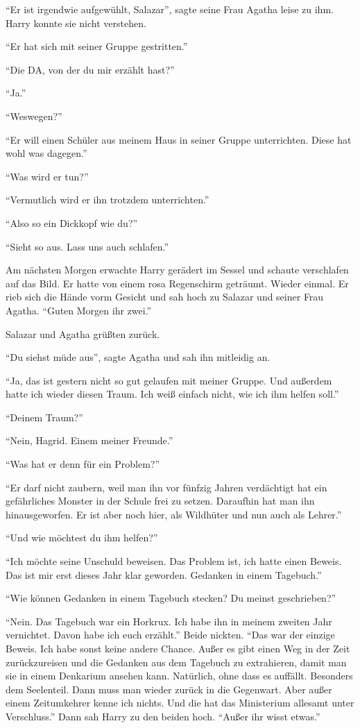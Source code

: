 \enquote{Er ist irgendwie aufgewühlt, Salazar}, sagte seine Frau Agatha leise zu ihm. Harry konnte sie nicht verstehen.

\enquote{Er hat sich mit seiner Gruppe gestritten.}

\enquote{Die DA, von der du mir erzählt hast?}

\enquote{Ja.}

\enquote{Weswegen?}

\enquote{Er will einen Schüler aus meinem Haus in seiner Gruppe unterrichten. Diese hat wohl was dagegen.}

\enquote{Was wird er tun?}

\enquote{Vermutlich wird er ihn trotzdem unterrichten.}

\enquote{Also so ein Dickkopf wie du?}

\enquote{Sieht so aus. Lass uns auch schlafen.}

Am nächsten Morgen erwachte Harry gerädert im Sessel und schaute verschlafen auf das Bild. Er hatte von einem rosa Regenschirm geträumt. Wieder einmal. Er rieb sich die Hände vorm Gesicht und sah hoch zu Salazar und seiner Frau Agatha. \enquote{Guten Morgen ihr zwei.}

Salazar und Agatha grüßten zurück.

\enquote{Du siehst müde aus}, sagte Agatha und sah ihn mitleidig an.

\enquote{Ja, das ist gestern nicht so gut gelaufen mit meiner Gruppe. Und außerdem hatte ich wieder diesen Traum. Ich weiß einfach nicht, wie ich ihm helfen soll.}

\enquote{Deinem Traum?}

\enquote{Nein, Hagrid. Einem meiner Freunde.}

\enquote{Was hat er denn für ein Problem?}

\enquote{Er darf nicht zaubern, weil man ihn vor fünfzig Jahren verdächtigt hat ein gefährliches Monster in der Schule frei zu setzen. Daraufhin hat man ihn hinausgeworfen. Er ist aber noch hier, als Wildhüter und nun auch als Lehrer.}

\enquote{Und wie möchtest du ihm helfen?}

\enquote{Ich möchte seine Unschuld beweisen. Das Problem ist, ich hatte einen Beweis. Das ist mir erst dieses Jahr klar geworden. Gedanken in einem Tagebuch.}

\enquote{Wie können Gedanken in einem Tagebuch stecken? Du meinst geschrieben?}

\enquote{Nein. Das Tagebuch war ein Horkrux. Ich habe ihn in meinem zweiten Jahr vernichtet. Davon habe ich euch erzählt.} Beide nickten. \enquote{Das war der einzige Beweis. Ich habe sonst keine andere Chance. Außer es gibt einen Weg in der Zeit zurückzureisen und die Gedanken aus dem Tagebuch zu extrahieren, damit man sie in einem Denkarium ansehen kann. Natürlich, ohne dass es auffällt. Besonders dem Seelenteil. Dann muss man wieder zurück in die Gegenwart. Aber außer einem Zeitumkehrer kenne ich nichts. Und die hat das Ministerium allesamt unter Verschluss.} Dann sah Harry zu den beiden hoch. \enquote{Außer ihr wisst etwas.}

